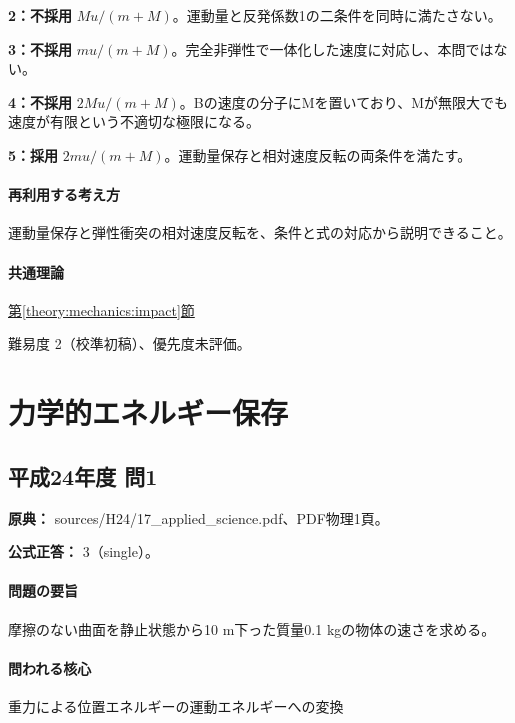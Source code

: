 \noindent\textbf{2：不採用} \(Mu/(m+M)\)。運動量と反発係数1の二条件を同時に満たさない。\par

\noindent\textbf{3：不採用} \(mu/(m+M)\)。完全非弾性で一体化した速度に対応し、本問ではない。\par

\noindent\textbf{4：不採用} \(2Mu/(m+M)\)。Bの速度の分子にMを置いており、Mが無限大でも速度が有限という不適切な極限になる。\par

\noindent\textbf{5：採用} \(2mu/(m+M)\)。運動量保存と相対速度反転の両条件を満たす。\par

\paragraph{再利用する考え方} 運動量保存と弾性衝突の相対速度反転を、条件と式の対応から説明できること。

\paragraph{共通理論} \hyperref[theory:mechanics:impact]{第\ref*{theory:mechanics:impact}節}

\par 難易度 2（校準初稿）、優先度未評価。

\section{力学的エネルギー保存}

\subsection{平成24年度 問1}
\label{q:h24-reg-applied-01}

\noindent\textbf{原典：} sources/H24/17\_applied\_science.pdf、PDF物理1頁。

\textbf{公式正答：} 3（single）。

\paragraph{問題の要旨} 摩擦のない曲面を静止状態から10 m下った質量0.1 kgの物体の速さを求める。

\paragraph{問われる核心} 重力による位置エネルギーの運動エネルギーへの変換

